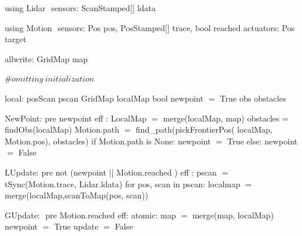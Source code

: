 using Lidar $\label{lidardef}$
    sensors:
       ScanStamped[] ldata

using Motion $\label{moddef}$
    sensors:
        Pos pos,
        PosStamped[] trace,
        bool reached
    actuators:
        Pos target

allwrite:$\label{awvar}$
    GridMap map

#$\mathit{omitting\ initialization}$

local:
   posScan pscan
   GridMap localMap
   bool newpoint $=$ True
   obs obstacles

NewPoint:$\label{newpt}$
  pre newpoint
  eff : LocalMap $=$ merge(localMap, map)
        obstacles = findObs(localMap)
        Motion.path $=$ find_path(pickFrontierPos(
                              localMap, Motion.pos), obstacles)
        if Motion.path is None:
           newpoint $=$ True
        else:
           newpoint $=$ False

LUpdate:$\label{lup}$
   pre not (newpoint || Motion.reached )
   eff : pscan $=$ tSync(Motion.trace, Lidar.ldata)
         for pos, scan in pscan:
             localmap $=$ merge(localMap,scanToMap(pos, scan))

GUpdate: $\label{gup}$
  pre Motion.reached
  eff: atomic:
           map $=$ merge(map, localMap)
        newpoint $=$ True
        update $=$ False